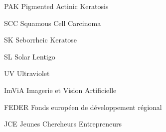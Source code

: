             {PAK}
            {Pigmented Actinic Keratosis}
            
            {SCC}
            {Squamous Cell Carcinoma}
            
            {SK}
            {Seborrheic Keratose}
            
            {SL}
            {Solar Lentigo}
            
            {UV}
            {Ultraviolet}

            {ImViA}
            {Imagerie et Vision Artificielle}
            
            {FEDER}
            {Fonds européen de développement régional}

            {JCE}
            {Jeunes Chercheurs Entrepreneurs}